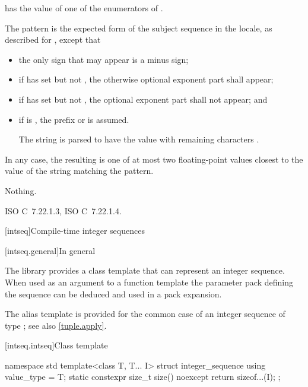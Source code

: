 \begin{itemdescr}
\pnum
\requires {} has the value of
one of the enumerators of .

\pnum
\effects The pattern is the expected form of the subject sequence
in the  locale,
as described for ,
except that
\begin{itemize}
\item
the only sign that may appear is a minus sign;
\item
if  has  set
but not ,
the otherwise optional exponent part shall appear;
\item
if  has  set
but not ,
the optional exponent part shall not appear; and
\item
if  is ,
the prefix  or  is assumed.
\begin{example}
The string 
is parsed to have the value
with remaining characters .
\end{example}
\end{itemize}
In any case, the resulting  is one of
at most two floating-point values
closest to the value of the string matching the pattern.

\pnum
\throws Nothing.
\end{itemdescr}

\xref ISO C~7.22.1.3, ISO C~7.22.1.4.

[intseq]{Compile-time integer sequences}

[intseq.general]{In general}

\pnum
The library provides a class template that can represent an integer sequence.
When used as an argument to a function template the parameter pack defining the
sequence can be deduced and used in a pack expansion.
\begin{note}
The  alias template is provided for the common case of
an integer sequence of type ; see also \ref{tuple.apply}.
\end{note}

[intseq.intseq]{Class template }

%
\begin{codeblock}
namespace std {
  template<class T, T... I>
    struct integer_sequence {
      using value_type = T;
      static constexpr size_t size() noexcept { return sizeof...(I); }
    };
}
\end{codeblock}

